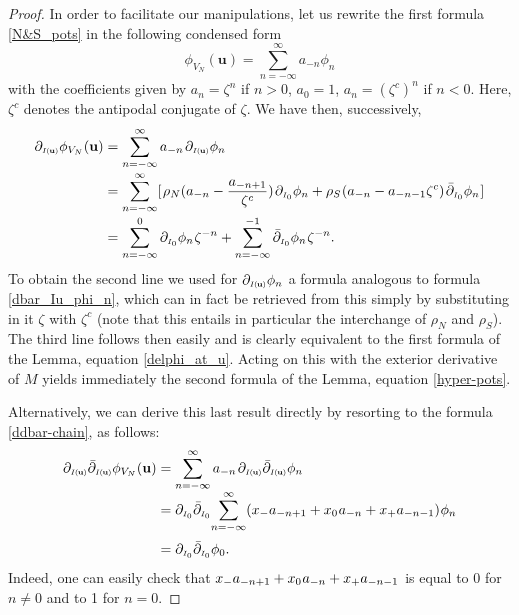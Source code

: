 \documentclass[11pt]{amsart}
\theoremstyle{remark}
\theoremstyle{remark}
\theoremstyle{definition}
\theoremstyle{definition}
\theoremstyle{definition}
\newcommand{\Iu}{\scriptscriptstyle{I\nhp(\nhp\mathbf{u}\hspace{-0.25pt})}} %
\newcommand{\Io}{{\scriptscriptstyle I_0}}
\newcommand{\0}{{\scriptstyle 0'}} %
\newcommand{\1}{{\scriptstyle 1'}}
\newcommand{\pt}{\hspace{1pt}} %
\newcommand{\hp}{\hspace{0.5pt}} %
\newcommand{\nhp}{\hspace{-0.5pt}} %
\begin{document}
\begin{proof} 

In order to facilitate our manipulations, let us rewrite the first formula \eqref{N&S_pots} in the following condensed form
\begin{equation}
\phi_{V_N}(\mathbf{u}) = \sum_{n=-\infty}^{\infty} a_{-n}\phi_n
\end{equation}
with the coefficients given by $a_n = \zeta^n$ if $n > 0$, $a_0=1$, $a_n = (\zeta^c)^n$ if $n < 0$. Here, $\zeta^c$ denotes the antipodal conjugate of $\zeta$. We have then, successively, 
{\allowdisplaybreaks
\begin{align}
\partial_{\Iu}\phi_{V_N}(\mathbf{u}) & = \sum_{n=-\infty}^{\infty} a_{-n} \pt \partial_{\Iu}\phi_n \\[-2pt]
& = \sum_{n=-\infty}^{\infty} [\pt \rho_N(a_{-n} - \frac{a_{-n+1}}{\zeta^c}) \pt \partial_{\Io}\phi_n + \rho_S \hp (a_{-n} - a_{-n-1}\zeta^c) \pt \bar{\partial}_{\Io}\phi_n \hp] \nonumber \\[-2pt]
& = \sum_{n=-\infty}^{0} \partial_{\Io}\phi_n \hp \zeta^{-n} + \sum_{n=-\infty}^{-1} \bar{\partial}_{\Io}\phi_n \hp \zeta^{-n} \rlap{.} \nonumber
\end{align}
}%
To obtain the second line we used for $\partial_{\Iu}\phi_n$ a formula analogous to formula \eqref{dbar_Iu_phi_n}, which can in fact be retrieved from this  simply by substituting in it $\zeta$ with $\zeta^c$ (note that this entails in particular the interchange of $\rho_N$ and $\rho_S$). The third line follows then easily and is clearly equivalent to the first formula of the Lemma, equation \eqref{delphi_at_u}. Acting on this with the exterior derivative of $M$ yields immediately the second formula of the Lemma, equation \eqref{hyper-pots}. 

Alternatively, we can derive this last result directly by resorting to the formula \eqref{ddbar-chain}, as follows: 
{\allowdisplaybreaks
\begin{align}
\partial_{\Iu} \bar{\partial}_{\Iu} \phi_{V_N}(\mathbf{u}) & = \sum_{n=-\infty}^{\infty} a_{-n} \pt \partial_{\Iu} \bar{\partial}_{\Iu} \phi_n \\[-4pt]
& = \partial_{\Io}\bar{\partial}_{\Io} \! \sum_{n=-\infty}^{\infty} (x_- a_{-n+1} + x_0 \hp a_{-n} + x_+ a_{-n-1}) \hp \phi_n \nonumber \\[2pt]
& = \partial_{\Io}\bar{\partial}_{\Io} \phi_0 \rlap{.} \nonumber
\end{align}
}%
Indeed, one can easily check that $x_- a_{-n+1} + x_0 \hp a_{-n} + x_+ a_{-n-1}$ is equal to 0 for $n \neq 0$ and to 1 for $n=0$.
\end{proof}
\end{document}
